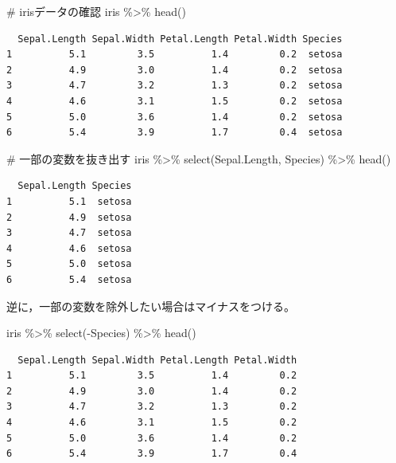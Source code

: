 \documentclass[
  a4paper,
]{ltjsbook}
\newenvironment{Shaded}{\begin{snugshade}}{\end{snugshade}}
\newcommand{\CommentTok}[1]{\textcolor[rgb]{0.37,0.37,0.37}{#1}}
\newcommand{\FunctionTok}[1]{\textcolor[rgb]{0.28,0.35,0.67}{#1}}
\newcommand{\NormalTok}[1]{\textcolor[rgb]{0.00,0.23,0.31}{#1}}
\newcommand{\SpecialCharTok}[1]{\textcolor[rgb]{0.37,0.37,0.37}{#1}}
\begin{document}
\begin{Shaded}
\begin{Highlighting}[]
\CommentTok{\# irisデータの確認}
\NormalTok{iris }\SpecialCharTok{\%\textgreater{}\%} \FunctionTok{head}\NormalTok{()}
\end{Highlighting}
\end{Shaded}

\begin{verbatim}
  Sepal.Length Sepal.Width Petal.Length Petal.Width Species
1          5.1         3.5          1.4         0.2  setosa
2          4.9         3.0          1.4         0.2  setosa
3          4.7         3.2          1.3         0.2  setosa
4          4.6         3.1          1.5         0.2  setosa
5          5.0         3.6          1.4         0.2  setosa
6          5.4         3.9          1.7         0.4  setosa
\end{verbatim}

\begin{Shaded}
\begin{Highlighting}[]
\CommentTok{\# 一部の変数を抜き出す}
\NormalTok{iris }\SpecialCharTok{\%\textgreater{}\%}
  \FunctionTok{select}\NormalTok{(Sepal.Length, Species) }\SpecialCharTok{\%\textgreater{}\%}
  \FunctionTok{head}\NormalTok{()}
\end{Highlighting}
\end{Shaded}

\begin{verbatim}
  Sepal.Length Species
1          5.1  setosa
2          4.9  setosa
3          4.7  setosa
4          4.6  setosa
5          5.0  setosa
6          5.4  setosa
\end{verbatim}

逆に，一部の変数を除外したい場合はマイナスをつける。

\begin{Shaded}
\begin{Highlighting}[]
\NormalTok{iris }\SpecialCharTok{\%\textgreater{}\%}
  \FunctionTok{select}\NormalTok{(}\SpecialCharTok{{-}}\NormalTok{Species) }\SpecialCharTok{\%\textgreater{}\%}
  \FunctionTok{head}\NormalTok{()}
\end{Highlighting}
\end{Shaded}

\begin{verbatim}
  Sepal.Length Sepal.Width Petal.Length Petal.Width
1          5.1         3.5          1.4         0.2
2          4.9         3.0          1.4         0.2
3          4.7         3.2          1.3         0.2
4          4.6         3.1          1.5         0.2
5          5.0         3.6          1.4         0.2
6          5.4         3.9          1.7         0.4
\end{verbatim}
\end{document}
